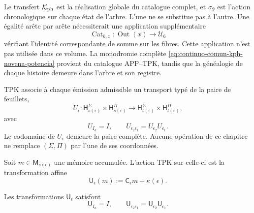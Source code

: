 \begin{remark}
\label{rem:continuo-comun-kph-no-identificacion-aristas}
Le transfert \(\mathcal K_{\rm ph}\) est la réalisation globale du catalogue complet, et \(\sigma_9\) est l'action chronologique sur chaque état de l'arbre. L'une ne se substitue pas à l'autre. Une égalité arête par arête nécessiterait une application supplémentaire
\[
 \operatorname{Cat}_{k,x}:\operatorname{Out}(x)\longrightarrow\mathcal U_6
\]
vérifiant l'identité correspondante de somme sur les fibres. Cette application n'est pas utilisée dans ce volume. La monodromie complète \eqref{eq:continuo-comun-kph-novena-potencia} provient du catalogue APP--TPK, tandis que la généalogie de chaque histoire demeure dans l'arbre et son registre.
\end{remark}

TPK associe à chaque émission admissible un transport typé de la paire de feuillets,
\begin{equation}
\label{eq:continuo-comun-transporte-hojas}
 U_\epsilon:
 \mathsf H_{s(\epsilon)}^{\Sigma}\times
 \mathsf H_{s(\epsilon)}^{\Pi}
 \longrightarrow
 \mathsf H_{t(\epsilon)}^{\Sigma}\times
 \mathsf H_{t(\epsilon)}^{\Pi},
\end{equation}
avec
\begin{equation}
\label{eq:continuo-comun-transporte-hojas-funtorial}
 U_{I_a}=I,
 \qquad
 U_{\epsilon_2\epsilon_1}=U_{\epsilon_2}U_{\epsilon_1}.
\end{equation}
Le codomaine de \(U_\epsilon\) demeure la paire complète. Aucune opération de ce chapitre ne remplace \((\Sigma,\Pi)\) par l'une de ses coordonnées.

Soit \(m\in\mathsf M_{s(\epsilon)}\) une mémoire accumulée. L'action TPK sur celle-ci est la transformation affine
\begin{equation}
\label{eq:continuo-comun-accion-memoria}
 \mathsf U_\epsilon(m)
 :=\mathsf C_\epsilon m+\kappa(\epsilon).
\end{equation}

\begin{lemma}
\label{lem:continuo-comun-accion-memoria}
Les transformations \(\mathsf U_\epsilon\) satisfont
\begin{equation}
\label{eq:continuo-comun-accion-memoria-composicion}
 \mathsf U_{I_a}=I,
 \qquad
 \mathsf U_{\epsilon_2\epsilon_1}
 =\mathsf U_{\epsilon_2}\mathsf U_{\epsilon_1}.
\end{equation}
\end{lemma}

